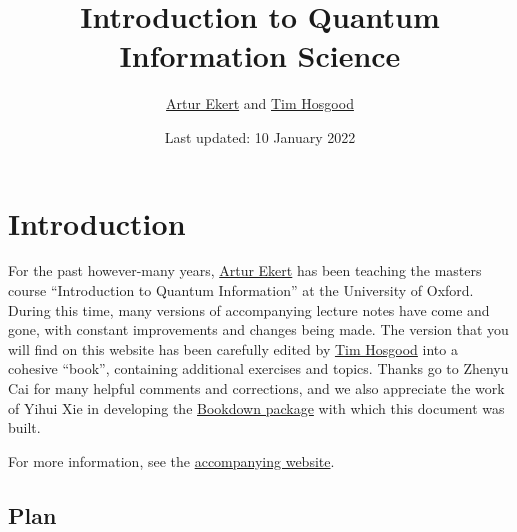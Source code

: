 \documentclass[fleqn]{article}
\title{Introduction to Quantum Information Science}
\author{\href{https://www.arturekert.org/}{Artur Ekert} and \href{https://thosgood.com}{Tim Hosgood}}
\date{Last updated: 10 January 2022}
\renewcommand{\leq}{\leqslant}
\renewcommand{\geq}{\geqslant}
\let\oldsection\section
\renewcommand\section{\clearpage\oldsection}
\begin{document}
\maketitle

\setcounter{tocdepth}{2}
\tableofcontents

\providecommand{\xmapsto}[1]{\overset{#1}{\longmapsto}}
\providecommand{\bra}[1]{\langle#1|}
\providecommand{\ket}[1]{|#1\rangle}
\providecommand{\braket}[2]{\langle#1|#2\rangle}
\providecommand{\proj}[1]{|#1\rangle\langle#1|}
\providecommand{\av}[1]{\langle#1\rangle}
\providecommand{\tr}{\operatorname{tr}}
\providecommand{\id}{\mathbf{1}}
\providecommand{\diag}[2]{\begin{bmatrix}#1&0\\0&#2\end{bmatrix}}
\providecommand{\mqty}[1]{\begin{matrix}#1\end{matrix}}
\providecommand{\bmqty}[1]{\begin{bmatrix}#1\end{bmatrix}}
\renewcommand{\leq}{\leqslant}
\renewcommand{\geq}{\geqslant}

\hypertarget{introduction}{%
\section*{Introduction}\label{introduction}}

For the past however-many years, \href{https://www.arturekert.com/}{Artur Ekert} has been teaching the masters course ``Introduction to Quantum Information'' at the University of Oxford.
During this time, many versions of accompanying lecture notes have come and gone, with constant improvements and changes being made.
The version that you will find on this website has been carefully edited by \href{https://thosgood.com}{Tim Hosgood} into a cohesive ``book'', containing additional exercises and topics.
Thanks go to Zhenyu Cai for many helpful comments and corrections, and we also appreciate the work of Yihui Xie in developing the \href{https://bookdown.org/yihui/bookdown/}{Bookdown package} with which this document was built.

For more information, see the \href{https://arturekert.org/iqis}{accompanying website}.

\hypertarget{plan}{%
\subsection*{Plan}\label{plan}}
\end{document}
